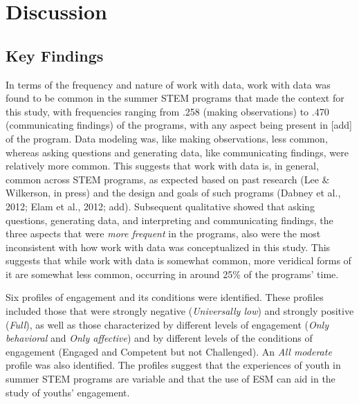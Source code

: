 \documentclass[]{book}
\theoremstyle{definition}
\theoremstyle{definition}
\theoremstyle{definition}
\theoremstyle{remark}
\begin{document}
\chapter{Discussion}\label{discussion}

\section{Key Findings}\label{key-findings}

In terms of the frequency and nature of work with data, work with data
was found to be common in the summer STEM programs that made the context
for this study, with frequencies ranging from .258 (making observations)
to .470 (communicating findings) of the programs, with any aspect being
present in {[}add{]} of the program. Data modeling was, like making
observations, less common, whereas asking questions and generating data,
like communicating findings, were relatively more common. This suggests
that work with data is, in general, common across STEM programs, as
expected based on past research (Lee \& Wilkerson, in press) and the
design and goals of such programs (Dabney et al., 2012; Elam et al.,
2012; add). Subsequent qualitative showed that asking questions,
generating data, and interpreting and communicating findings, the three
aspects that were \emph{more frequent} in the programs, also were the
most inconsistent with how work with data was conceptualized in this
study. This suggests that while work with data is somewhat common, more
veridical forms of it are somewhat less common, occurring in around 25\%
of the programs' time.

Six profiles of engagement and its conditions were identified. These
profiles included those that were strongly negative (\emph{Universally
low}) and strongly positive (\emph{Full}), as well as those
characterized by different levels of engagement (\emph{Only behavioral}
and \emph{Only affective}) and by different levels of the conditions of
engagement (Engaged and Competent but not Challenged). An \emph{All
moderate} profile was also identified. The profiles suggest that the
experiences of youth in summer STEM programs are variable and that the
use of ESM can aid in the study of youths' engagement.
\end{document}

